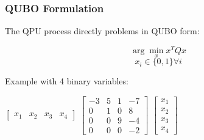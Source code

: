 \documentclass[aspectratio=169]{beamer}
\begin{document}
\begin{frame}
    \frametitle{QUBO Formulation}

    The QPU process directly problems in QUBO form:

    $$\arg\min_x x^TQx$$
    $$x_i \in \{0, 1\} \forall i$$

    Example with 4 binary variables:

    \begin{center}         
        $\begin{bmatrix}
          x_1 & x_2 & x_3 & x_4
        \end{bmatrix}$
        $\begin{bmatrix}
          -3 & 5 & 1 & -7 \\
          0 & 1 & 0 & 8 \\
          0 & 0 & 9 & -4 \\
          0 & 0 & 0 & -2 
        \end{bmatrix}$
        $\begin{bmatrix}
          x_1 \\ x_2 \\ x_3 \\ x_4
        \end{bmatrix}$      
    \end{center}

\end{frame}
\end{document}
